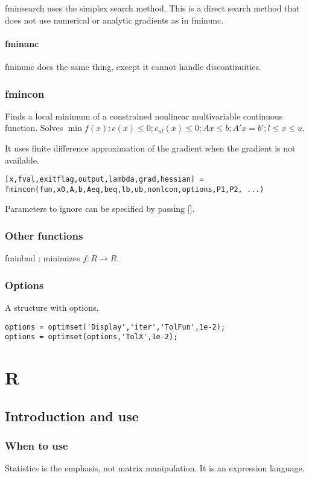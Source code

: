 \documentclass[oneside, article]{memoir}
\begin{document}
fminsearch uses the simplex search method. This is a direct search method that does not use numerical or analytic gradients as in fminunc.

\subsubsection{fminunc}
fminunc does the same thing, except it cannot handle discontinuities. \chk

\subsection{fmincon}
Finds a local minimum of a constrained nonlinear multivariable continuous function. Solves $\min f(x): c(x) \leq 0; c_{nl}(x) \leq 0; Ax \leq b; A'x = b'; l \leq x \leq u$.

It uses finite difference approximation of the gradient when the gradient is not available.

\begin{lstlisting}
[x,fval,exitflag,output,lambda,grad,hessian] = fmincon(fun,x0,A,b,Aeq,beq,lb,ub,nonlcon,options,P1,P2, ...)
\end{lstlisting}

Parameters to ignore can be specified by passing [].

\subsection{Other functions}
fminbnd : minimizes $f:R \to R$.

\subsection{Options}
A structure with options.

\begin{lstlisting}
options = optimset('Display','iter','TolFun',1e-2);
options = optimset(options,'TolX',1e-2);
\end{lstlisting}


\chapter{R}
\section{Introduction and use}
\subsection{When to use}
Statistics is the emphasis, not matrix manipulation. It is an expression language.
\end{document}

